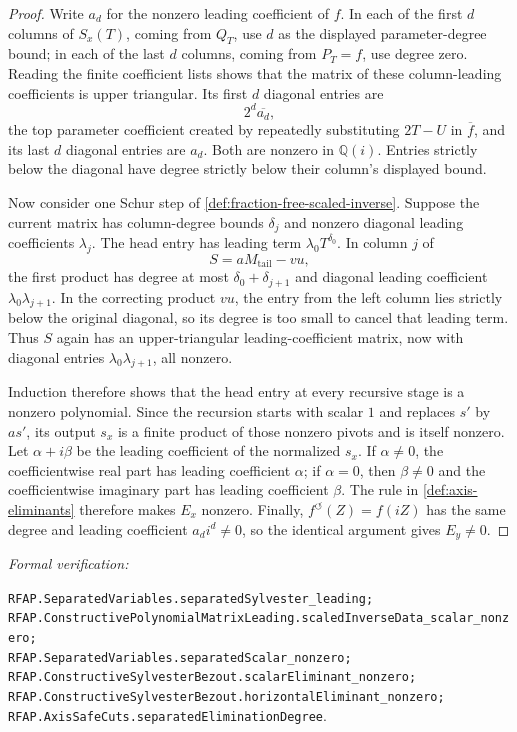 \documentclass[11pt]{article}
\newcommand{\Qi}{\mathbb{Q}(i)}
\newcommand{\leanref}[1]{\par\smallskip\noindent
  \emph{Formal verification:}\par\nobreak
  {\raggedright\nolinkurl{#1}.\par}}
\begin{document}
\begin{proof}
Write $a_d$ for the nonzero leading coefficient of $f$.  In each of the
first $d$ columns of $S_x(T)$, coming from $Q_T$, use $d$ as the displayed
parameter-degree bound; in each of the last $d$ columns, coming from
$P_T=f$, use degree zero.  Reading the finite coefficient lists shows that
the matrix of these column-leading coefficients is upper triangular.  Its
first $d$ diagonal entries are
\[
                  2^d\overline{a_d},
\]
the top parameter coefficient created by repeatedly substituting $2T-U$
in $\overline f$, and its last $d$ diagonal entries are $a_d$.  Both are
nonzero in $\Qi$.  Entries strictly below the diagonal have degree strictly
below their column's displayed bound.

Now consider one Schur step of \cref{def:fraction-free-scaled-inverse}.
Suppose the current matrix has column-degree bounds $\delta_j$ and nonzero
diagonal leading coefficients $\lambda_j$.  The head entry has leading term
$\lambda_0T^{\delta_0}$.  In column $j$ of
\[
                 S=aM_{\mathrm{tail}}-vu,
\]
the first product has degree at most $\delta_0+\delta_{j+1}$ and diagonal
leading coefficient $\lambda_0\lambda_{j+1}$.  In the correcting product
$vu$, the entry from the left column lies strictly below the original
diagonal, so its degree is too small to cancel that leading term.  Thus $S$
again has an upper-triangular leading-coefficient matrix, now with diagonal
entries $\lambda_0\lambda_{j+1}$, all nonzero.

Induction therefore shows that the head entry at every recursive stage is a
nonzero polynomial.  Since the recursion starts with scalar $1$ and replaces
$s'$ by $as'$, its output $s_x$ is a finite product of those nonzero pivots
and is itself nonzero.  Let $\alpha+i\beta$ be the leading coefficient of
the normalized $s_x$.  If $\alpha\ne0$, the coefficientwise real part has
leading coefficient $\alpha$; if $\alpha=0$, then $\beta\ne0$ and the
coefficientwise imaginary part has leading coefficient $\beta$.  The rule in
\cref{def:axis-eliminants} therefore makes $E_x$ nonzero.  Finally,
$f^{\circlearrowleft}(Z)=f(iZ)$ has the same degree and leading coefficient
$a_di^d\ne0$, so the identical argument gives $E_y\ne0$.
\end{proof}

\leanref{RFAP.SeparatedVariables.separatedSylvester_leading;
RFAP.ConstructivePolynomialMatrixLeading.scaledInverseData_scalar_nonzero;
RFAP.SeparatedVariables.separatedScalar_nonzero;
RFAP.ConstructiveSylvesterBezout.scalarEliminant_nonzero;
RFAP.ConstructiveSylvesterBezout.horizontalEliminant_nonzero;
RFAP.AxisSafeCuts.separatedEliminationDegree}
\end{document}
